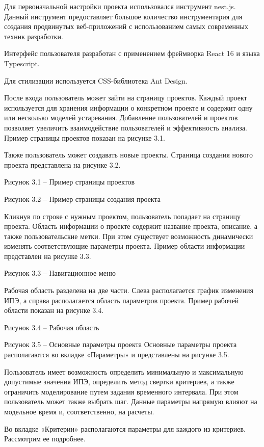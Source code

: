 Для первоначальной настройки проекта использовался инструмент nest.js. 
Данный инструмент предоставляет большое количество инструментария для создания продвинутых веб-приложений с использованием самых современных техник разработки.

Интерфейс пользователя разработан с применением фреймворка React 16 и языка Typescript.

Для стилизации используется CSS-библиотека Ant Design.

После входа пользователь может зайти на страницу проектов. 
Каждый проект используется для хранения информации о конкретном проекте и содержит одну или несколько моделей устаревания. 
Добавление пользователей и проектов позволяет увеличить взаимодействие пользователей и эффективность анализа. 
Пример страницы проектов показан на рисунке 3.1.

Также пользователь может создавать новые проекты. 
Страница создания нового проекта представлена на рисунке 3.2.


Рисунок 3.1 – Пример страницы проектов
 
Рисунок 3.2 – Пример страницы создания проекта

Кликнув по строке с нужным проектом, пользователь попадает на страницу проекта. 
Область информации о проекте содержит название проекта, описание, а также пользовательские метки. 
При этом существует возможность динамически изменять соответствующие параметры проекта. 
Пример области информации представлен на рисунке 3.3.

 
Рисунок 3.3 – Навигационное меню

Рабочая область разделена на две части. 
Слева располагается график изменения ИПЭ, а справа располагается область параметров проекта. 
Пример рабочей области показан на рисунке 3.4.

 
Рисунок 3.4 – Рабочая область

 
Рисунок 3.5 – Основные параметры проекта
Основные параметры проекта располагаются во вкладке «Параметры» и представлены на рисунке 3.5.

Пользователь имеет возможность определить минимальную и максимальную допустимые значения ИПЭ, определить метод свертки критериев, а также ограничить моделирование путем задания временного интервала. 
При этом пользователь может также выбрать шаг. 
Данные параметры напрямую влияют на модельное время и, соответственно, на расчеты.

Во вкладке «Критерии» располагаются параметры для каждого из критериев. 
Рассмотрим ее подробнее.

